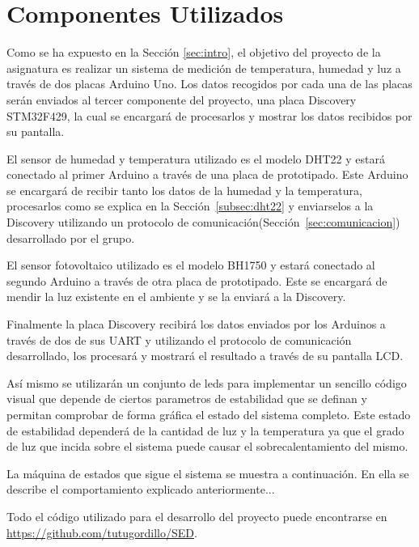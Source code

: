 \section{Componentes Utilizados}\label{sec:arquitectura}

Como se ha expuesto en la Secci\'on \ref{sec:intro}, el objetivo del
proyecto de la asignatura es realizar un sistema de medici\'on de
temperatura, humedad y luz a trav\'es de dos placas Arduino Uno. Los
datos recogidos por cada una de las placas ser\'an enviados al tercer
componente del proyecto, una placa Discovery STM32F429, la cual se
encargar\'a de procesarlos y mostrar los datos recibidos por su
pantalla.

El sensor de humedad y temperatura utilizado es el modelo DHT22 y
estar\'a conectado al primer Arduino a trav\'es de una placa de
prototipado. Este Arduino se encargar\'a de recibir tanto los datos de
la humedad y la temperatura, procesarlos como se explica en la
Secci\'on~\ref{subsec:dht22} y enviarselos a la Discovery utilizando
un protocolo de comunicaci\'on(Secci\'on~\ref{sec:comunicacion}) desarrollado por el grupo.

El sensor fotovoltaico utilizado es el modelo BH1750 y estar\'a
conectado al segundo Arduino a trav\'es de otra placa de
prototipado. Este se encargar\'a de mendir la luz existente en el
ambiente y se la enviar\'a a la Discovery.

Finalmente la placa Discovery recibir\'a los datos enviados por los
Arduinos a trav\'es de dos de sus UART y utilizando el protocolo de
comunicaci\'on desarrollado, los procesar\'a y mostrar\'a el resultado
a trav\'es de su pantalla LCD.

As\'i mismo se utilizar\'an un conjunto de leds para implementar un
sencillo c\'odigo visual que depende de ciertos parametros de
estabilidad que se definan y permitan comprobar de forma gr\'afica el
estado del sistema completo. Este estado de estabilidad depender\'a de
la cantidad de luz y la temperatura ya que el grado de luz que incida
sobre el sistema puede causar el sobrecalentamiento del mismo.

La m\'aquina de estados que sigue el sistema se muestra a
continuaci\'on. En ella se describe el comportamiento explicado
anteriormente...

Todo el c\'odigo utilizado para el desarrollo del proyecto puede
encontrarse en \url{https://github.com/tutugordillo/SED}.
